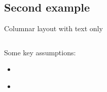 \documentclass[aspectratio=169, 10pt]{beamer}
\begin{document}
\subsection{Second example}
\begin{frame}{Columnar layout with text only}
    \justifying
    \lipsum[1][1-5]\\[8ex]
  
    \begin{columns}
        \pause
        \centering
        \begin{column}{0.46\textwidth}
            \justifying
            Some key assumptions:
            \begin{itemize}
                \item \textit{\lipsum[1][6]}
                \item \textit{\lipsum[1][7]}
            \end{itemize}
            \vspace{0.2cm}
        \end{column}
        \pause
        \begin{column}{0.46\textwidth}
            \justifying
            \textbf{\lipsum[1][8-12]}
        \end{column}
    \end{columns}
\end{frame}
\end{document}
